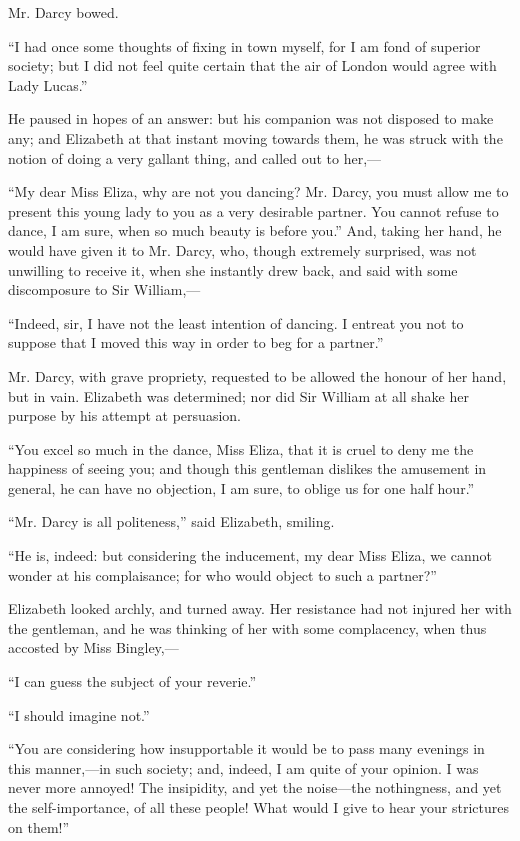 \documentclass[10pt]{book}
\begin{document}
   Mr. Darcy bowed.
  

   “I had once some thoughts of fixing in town myself, for I am fond of
superior society; but I did not feel quite certain that the air of
London would agree with Lady Lucas.”
  

   He paused in hopes of an answer: but his companion was not disposed to
make any; and Elizabeth at that instant moving towards them, he was
struck with the
   notion of doing a very gallant thing, and called out to
her,—
  

   “My dear Miss Eliza, why are not you dancing? Mr. Darcy, you must allow
me to present this young lady to you as a very desirable partner. You
cannot refuse to dance, I am sure, when so much beauty is before you.”
And, taking her hand, he would have given it to Mr. Darcy, who, though
extremely surprised, was not unwilling to receive it, when she instantly
drew back, and said with some discomposure to Sir William,—
  

   “Indeed, sir, I have not the least intention of dancing. I entreat you
not to suppose that I moved this way in order to beg for a partner.”
  

   Mr. Darcy, with grave propriety, requested to be allowed the honour of
her hand, but in vain. Elizabeth was determined; nor did Sir William at
all shake her purpose by his attempt at persuasion.
  

   “You excel so much in the dance, Miss Eliza, that it is cruel to deny me
the happiness of seeing you; and though this gentleman dislikes the
amusement in general, he can have no objection, I am sure, to oblige us
for one half hour.”
  

   “Mr. Darcy is all politeness,” said Elizabeth, smiling.
  

   “He is, indeed: but considering the inducement, my dear Miss Eliza, we
cannot wonder at his complaisance; for who would object to such a
partner?”
  

   Elizabeth looked archly, and turned away. Her resistance had not injured
her with the gentleman, and he was thinking of her with some
complacency, when thus accosted by Miss Bingley,—
  

   “I can guess the subject of your reverie.”
  

   “I should imagine not.”
  

   “You are considering how insupportable it would be
   to pass many
evenings in this manner,—in such society; and, indeed, I am quite of
your opinion. I was never more annoyed! The insipidity, and yet the
noise—the nothingness, and yet the self-importance, of all these
people! What would I give to hear your strictures on them!”
  
\end{document}

